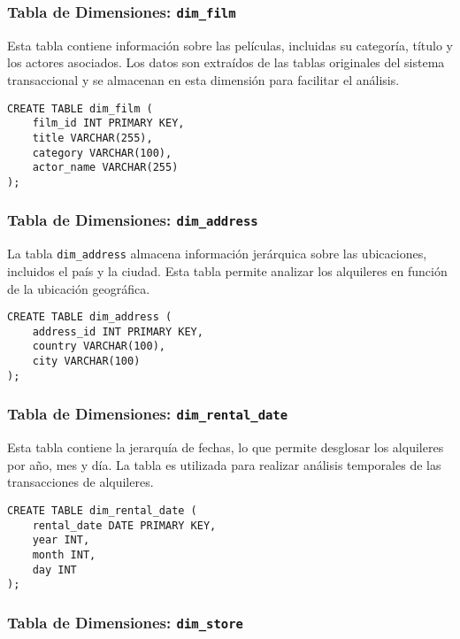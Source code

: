 \documentclass{article}
\begin{document}
\subsubsection{Tabla de Dimensiones: \texttt{dim\_film}}

Esta tabla contiene información sobre las películas, incluidas su categoría, título y los actores asociados. Los datos son extraídos de las tablas originales del sistema transaccional y se almacenan en esta dimensión para facilitar el análisis.

\begin{lstlisting}
CREATE TABLE dim_film (
    film_id INT PRIMARY KEY,
    title VARCHAR(255),
    category VARCHAR(100),
    actor_name VARCHAR(255)
);
\end{lstlisting}

\subsubsection{Tabla de Dimensiones: \texttt{dim\_address}}

La tabla \texttt{dim\_address} almacena información jerárquica sobre las ubicaciones, incluidos el país y la ciudad. Esta tabla permite analizar los alquileres en función de la ubicación geográfica.

\begin{lstlisting}
CREATE TABLE dim_address (
    address_id INT PRIMARY KEY,
    country VARCHAR(100),
    city VARCHAR(100)
);
\end{lstlisting}

\newpage
\subsubsection{Tabla de Dimensiones: \texttt{dim\_rental\_date}}

Esta tabla contiene la jerarquía de fechas, lo que permite desglosar los alquileres por año, mes y día. La tabla es utilizada para realizar análisis temporales de las transacciones de alquileres.

\begin{lstlisting}
CREATE TABLE dim_rental_date (
    rental_date DATE PRIMARY KEY,
    year INT,
    month INT,
    day INT
);
\end{lstlisting}

\subsubsection{Tabla de Dimensiones: \texttt{dim\_store}}
\end{document}
